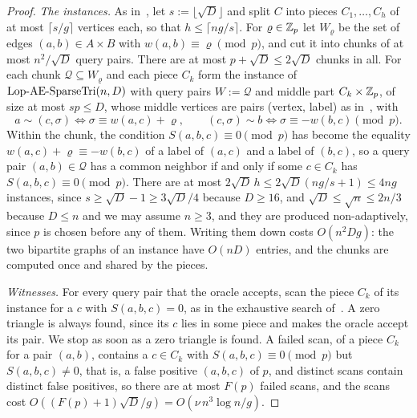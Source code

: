 \begin{proof}
\emph{The instances.} As in~\cite{CX24}, let $s:=\lfloor\sqrt D\rfloor$ and split $C$ into pieces $C_1,\ldots,C_h$ of at most $\lceil s/g\rceil$ vertices each, so that $h\le\lceil ng/s\rceil$. For $\varrho\in\mathbb{Z}_p$ let $W_\varrho$ be the set of edges $(a,b)\in A\times B$ with $w(a,b)\equiv\varrho\pmod p$, and cut it into chunks of at most $n^2/\sqrt D$ query pairs. There are at most $p+\sqrt D\le2\sqrt D$ chunks in all. For each chunk $\mathcal Q\subseteq W_\varrho$ and each piece $C_k$ form the instance of $\mathrm{Lop}\text{-}\mathrm{AE}\text{-}\mathrm{SparseTri}(n,D)$ with query pairs $W:=\mathcal Q$ and middle part $C_k\times\mathbb{Z}_p$, of size at most $sp\le D$, whose middle vertices are pairs (vertex, label) as in~\cite{CX24}, with
\[
a\sim(c,\sigma)\iff\sigma\equiv w(a,c)+\varrho,\qquad(c,\sigma)\sim b\iff\sigma\equiv-w(b,c)\pmod p .
\]
Within the chunk, the condition $S(a,b,c)\equiv0\pmod p$ has become the equality $w(a,c)+\varrho\equiv-w(b,c)$ of a label of $(a,c)$ and a label of $(b,c)$, so a query pair $(a,b)\in\mathcal Q$ has a common neighbor if and only if some $c\in C_k$ has $S(a,b,c)\equiv0\pmod p$. There are at most $2\sqrt D\,h\le2\sqrt D(ng/s+1)\le4ng$ instances, since $s\ge\sqrt D-1\ge3\sqrt D/4$ because $D\ge16$, and $\sqrt D\le\sqrt n\le2n/3$ because $D\le n$ and we may assume $n\ge3$, and they are produced non-adaptively, since $p$ is chosen before any of them. Writing them down costs $O(n^2Dg)$: the two bipartite graphs of an instance have $O(nD)$ entries, and the chunks are computed once and shared by the pieces.

\emph{Witnesses.} For every query pair that the oracle accepts, scan the piece $C_k$ of its instance for a $c$ with $S(a,b,c)=0$, as in the exhaustive search of~\cite{CX24}. A zero triangle is always found, since its $c$ lies in some piece and makes the oracle accept its pair. We stop as soon as a zero triangle is found. A failed scan, of a piece $C_k$ for a pair $(a,b)$, contains a $c\in C_k$ with $S(a,b,c)\equiv0\pmod p$ but $S(a,b,c)\ne0$, that is, a false positive $(a,b,c)$ of $p$, and distinct scans contain distinct false positives, so there are at most $F(p)$ failed scans, and the scans cost $O((F(p)+1)\sqrt D/g)=O(\nu\,n^3\log n/g)$.
\end{proof}

